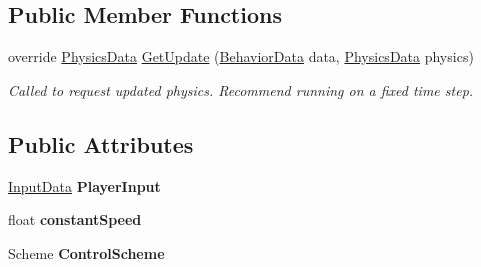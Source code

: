 \subsection*{Public Member Functions}
\begin{DoxyCompactItemize}
\item 
override \hyperlink{class_skyrates_1_1_common_1_1_a_i_1_1_physics_data}{Physics\-Data} \hyperlink{class_skyrates_1_1_common_1_1_a_i_1_1_user_controlled_aa4c5fd1d3a7a9b8e8836bc03e986d4a5}{Get\-Update} (\hyperlink{class_skyrates_1_1_common_1_1_a_i_1_1_behavior_data}{Behavior\-Data} data, \hyperlink{class_skyrates_1_1_common_1_1_a_i_1_1_physics_data}{Physics\-Data} physics)
\begin{DoxyCompactList}\small\item\em Called to request updated physics. Recommend running on a fixed time step. \end{DoxyCompactList}\end{DoxyCompactItemize}
\subsection*{Public Attributes}
\begin{DoxyCompactItemize}
\item 
\hypertarget{class_skyrates_1_1_common_1_1_a_i_1_1_user_controlled_a28aaa2a5729a9798c652c0bdc16a809f}{\hyperlink{class_skyrates_1_1_common_1_1_a_i_1_1_user_controlled_1_1_input_data}{Input\-Data} {\bfseries Player\-Input}}\label{class_skyrates_1_1_common_1_1_a_i_1_1_user_controlled_a28aaa2a5729a9798c652c0bdc16a809f}

\item 
\hypertarget{class_skyrates_1_1_common_1_1_a_i_1_1_user_controlled_a5e500dc66280d7a3bae4283f26ca5af7}{float {\bfseries constant\-Speed}}\label{class_skyrates_1_1_common_1_1_a_i_1_1_user_controlled_a5e500dc66280d7a3bae4283f26ca5af7}

\item 
\hypertarget{class_skyrates_1_1_common_1_1_a_i_1_1_user_controlled_a0d673217731707b95b402c1b21c22467}{Scheme {\bfseries Control\-Scheme}}\label{class_skyrates_1_1_common_1_1_a_i_1_1_user_controlled_a0d673217731707b95b402c1b21c22467}

\end{DoxyCompactItemize}


